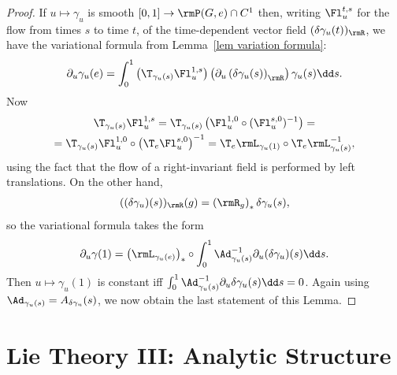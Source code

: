 \begin{proof}
    If $u\mapsto \gamma_u$ is smooth $[0,1]\to \rmP(G,e)\cap C^1$ then, writing $\Fl^{t,s}_u$ for the flow from times $s$ to time $t$, of the time-dependent vector field $(\delta\gamma_u(t))_\rmR$, we have the variational formula from Lemma~\ref{lem variation formula}:
    \[\partial_u\gamma_u(e)=\int_0^1 \left(\T_{\gamma_u(s)}\Fl^{1,s}_u\right)\left(\partial_u \left(\delta\gamma_u(s)\right)_\rmR\right)\gamma_u(s)\dd s.\]
    Now 
    \begin{multline}
        \T_{\gamma_u(s)}\Fl^{1,s}_u=\T_{\gamma_u(s)}\left(\Fl_u^{1,0}\circ (\Fl^{s,0}_u)^{-1}\right)=\\=\T_{\gamma_u(s)}\Fl_u^{1,0}\circ \left(\T_e\Fl^{s,0}_u\right)^{-1}= \T_{e}\rmL_{\gamma_u(1)}\circ \T_e \rmL_{\gamma_u(s)}^{-1},
    \end{multline}
    using the fact that the flow of a right-invariant field is performed by left translations.  On the other hand,
    \[((\delta \gamma_u)(s))_\rmR(g)=\left(\rmR_g\right)_\ast \delta\gamma_u(s),\]
    so the variational formula takes the form
    \[\partial_u\gamma(1)=\left(\rmL_{\gamma_u(e)}\right)_\ast\circ\int_0^1 \Ad_{\gamma_u(s)}^{-1}\partial_u(\delta\gamma_u)(s)\dd s.\]
    Then $u\mapsto\gamma_u(1)$ is constant iff $\int_0^1\Ad_{\gamma_u(s)}^{-1}\partial_u\delta\gamma_u(s)\dd s=0$. Again using $\Ad_{\gamma_u(s)}=A_{\delta \gamma_u}(s)$, we now obtain the last statement of this Lemma.
\end{proof}















\clearpage
\chapter{Lie Theory III: Analytic Structure}\label{sec: Lie theory iii}

